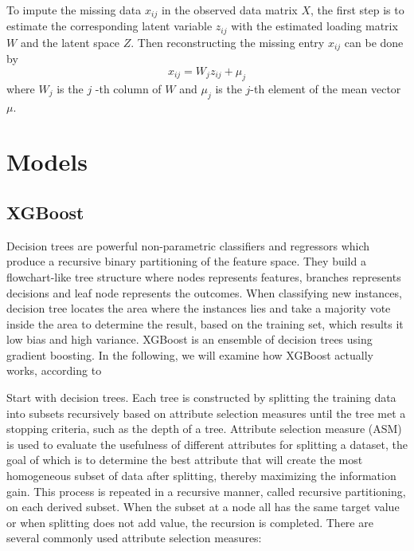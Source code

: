 \documentclass[12pt,a4paper,english
]{tunithesis}
\begin{document}
To impute the missing data $x_{ij}$ in the observed data matrix $X$, the first step is to estimate the corresponding latent variable $z_{ij}$ with the estimated loading matrix $W$ and the latent space $Z$. Then reconstructing the missing entry  $x_{ij}$ can be done by
\begin{equation*}
    {x_{ij}} = {W_j}{z_{ij}}+{\mu _j}
\end{equation*}
where $W_j$ is the $j$ -th column of $W$ and $\mu_j$ is the $j$-th element of the mean vector $\mu$.


\section{Models}
\subsection{XGBoost}
Decision trees are powerful non-parametric classifiers and regressors which produce a recursive binary partitioning of the feature space. They build a flowchart-like tree structure where nodes represents features, branches represents decisions and leaf node represents the outcomes. When classifying new instances, decision tree locates the area where the instances lies and take a majority vote inside the area to determine the result, based on the training set, which results it low bias and high variance. XGBoost is an ensemble of decision trees using gradient boosting. In the following, we will examine how XGBoost actually works, according to \textcite{song2015, chen2016}

Start with decision trees. Each tree is constructed by splitting the training data into subsets recursively based on attribute selection measures until the tree met a stopping criteria, such as the depth of a tree. Attribute selection measure (ASM) is used to evaluate the usefulness of different attributes for splitting a dataset, the goal of which is to determine the best attribute that will create the most homogeneous subset of data after splitting, thereby maximizing the information gain. This process is repeated in a recursive manner, called recursive partitioning, on each derived subset. When the subset at a node all has the same target value or when splitting does not add value, the recursion is completed. There are several commonly used attribute selection measures:
\end{document}
